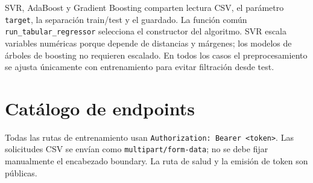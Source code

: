 \documentclass[11pt,a4paper]{article}
\begin{document}
SVR, AdaBoost y Gradient Boosting comparten lectura CSV, el parámetro \texttt{target}, la separación train/test y el guardado. La función común \texttt{run\_tabular\_regressor} selecciona el constructor del algoritmo. SVR escala variables numéricas porque depende de distancias y márgenes; los modelos de árboles de boosting no requieren escalado. En todos los casos el preprocesamiento se ajusta únicamente con entrenamiento para evitar filtración desde test.

\section{Catálogo de endpoints}
Todas las rutas de entrenamiento usan \texttt{Authorization: Bearer <token>}. Las solicitudes CSV se envían como \texttt{multipart/form-data}; no se debe fijar manualmente el encabezado boundary. La ruta de salud y la emisión de token son públicas.
\end{document}
